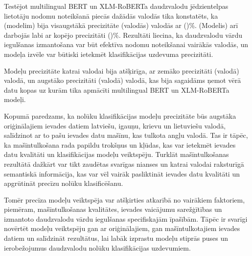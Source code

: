 
Testējot multilingual BERT un XLM-RoBERTa daudzvalodu jēdzientelpas lietotāju nodomu noteikšanā piecās dažādās valodās tika konstatēts, ka (modelim) bija visaugstākā precizitāte (valodās) valodās ar ()\%. (Modelis) arī darbojās labi ar kopējo precizitāti ()\%. Rezultāti liecina, ka daudzvalodu vārdu iegulšanas izmantošana var būt efektīva nodomu noteikšanai vairākās valodās, un modeļa izvēle var būtiski ietekmēt klasifikācijas uzdevuma precizitāti.

Modeļu precizitāte katrai valodai bija atšķirīga, ar zemāko precizitāti (valodā) valodā, un augstāko precizitāti (valodā) valodā, kas bija sagaidāms ņemot vērā datu kopas uz kurām tika apmācīti multilingual BERT un XLM-RoBERTa modeļi. 


Kopumā paredzams, ka nolūku klasifikācijas modeļu precizitāte būs augstāka oriģinālajiem ievades datiem latviešu, igauņu, krievu un lietuviešu valodā, salīdzinot ar to pašu ievades datu mašīnu, kas tulkota angļu valodā. Tas ir tāpēc, ka mašīntulkošana rada papildu trokšņus un kļūdas, kas var ietekmēt ievades datu kvalitāti un klasifikācijas modeļu veiktspēju. Turklāt mašīntulkošanas rezultātā dažkārt var tikt zaudētas svarīgas nianses un katrai valodai raksturīgā semantiskā informācija, kas var vēl vairāk pasliktināt ievades datu kvalitāti un apgrūtināt precīzu nolūku klasificēšanu.

Tomēr precīza modeļu veiktspēja var atšķirties atkarībā no vairākiem faktoriem, piemēram, mašīntulkošanas kvalitātes, ievades vaicājumu sarežģītības un izmantoto daudzvalodu vārdu iegulšanas specifiskajām īpašībām. Tāpēc ir svarīgi novērtēt modeļu veiktspēju gan ar oriģinālajiem, gan mašīntulkotajiem ievades datiem un salīdzināt rezultātus, lai labāk izprastu modeļu stiprās puses un ierobežojumus daudzvalodu nolūku klasifikācijas uzdevumiem.
